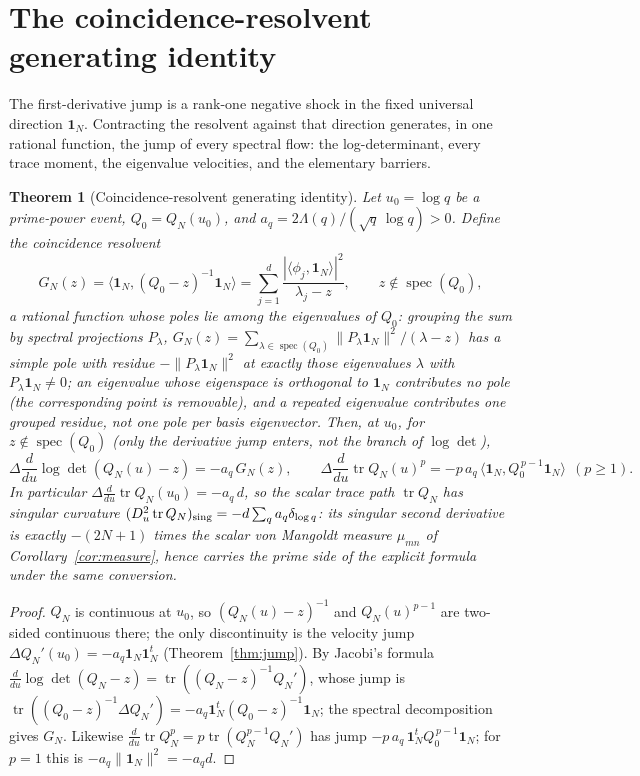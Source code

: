 \documentclass[11pt]{article}
\theoremstyle{plain}
\newtheorem{theorem}{Theorem}[section]
\theoremstyle{definition}
\theoremstyle{remark}
\newcommand{\one}{\mathbf 1}
\newcommand{\Lam}{\Lambda}
\begin{document}
\section{The coincidence-resolvent generating identity}\label{sec:deflation}

The first-derivative jump is a rank-one negative shock in the fixed universal
direction $\one_N$. Contracting the resolvent against that direction generates,
in one rational function, the jump of every spectral flow: the log-determinant,
every trace moment, the eigenvalue velocities, and the elementary barriers.

\begin{theorem}[Coincidence-resolvent generating identity]\label{thm:generating}
Let $u_0=\log q$ be a prime-power event, $Q_0=Q_N(u_0)$, and
$a_q=2\Lam(q)/(\sqrt q\,\log q)>0$. Define the \emph{coincidence resolvent}
\[
        G_N(z)=\bigl\langle\one_N,(Q_0-z)^{-1}\one_N\bigr\rangle
        =\sum_{j=1}^d\frac{|\langle\phi_j,\one_N\rangle|^2}{\lambda_j-z},
        \qquad z\notin\operatorname{spec}(Q_0),
\]
a rational function whose poles lie among the eigenvalues of $Q_0$: grouping the
sum by spectral projections $P_\lambda$,
$G_N(z)=\sum_{\lambda\in\operatorname{spec}(Q_0)}\|P_\lambda\one_N\|^2/(\lambda-z)$
has a simple pole with residue $-\|P_\lambda\one_N\|^2$ at exactly those
eigenvalues $\lambda$ with $P_\lambda\one_N\ne0$; an eigenvalue whose eigenspace
is orthogonal to $\one_N$ contributes no pole (the corresponding point is
removable), and a repeated eigenvalue contributes one grouped residue, not one
pole per basis eigenvector. Then, at $u_0$, for $z\notin
\operatorname{spec}(Q_0)$ (only the derivative jump enters, not the branch of
$\log\det$),
\[
 \Delta\frac{d}{du}\log\det(Q_N(u)-z)=-a_q\,G_N(z),
 \qquad
 \Delta\frac{d}{du}\operatorname{tr}Q_N(u)^p=-p\,a_q\,
 \bigl\langle\one_N,Q_0^{\,p-1}\one_N\bigr\rangle\ \ (p\ge1).
\]
In particular $\Delta\frac{d}{du}\operatorname{tr}Q_N(u_0)=-a_q\,d$, so the scalar
trace path $\operatorname{tr}Q_N$ has singular curvature
$(D_u^2\operatorname{tr}Q_N)_{\rm sing}=-d\sum_q a_q\delta_{\log q}$: its
singular second
derivative is exactly $-(2N+1)$ times the scalar von Mangoldt measure
$\mu_{mn}$ of Corollary~\ref{cor:measure}, hence carries the prime side of the
explicit formula under the same conversion.
\end{theorem}

\begin{proof}
$Q_N$ is continuous at $u_0$, so $(Q_N(u)-z)^{-1}$ and $Q_N(u)^{p-1}$ are
two-sided continuous there; the only discontinuity is the velocity jump
$\Delta Q_N'(u_0)=-a_q\one_N\one_N^t$ (Theorem~\ref{thm:jump}). By Jacobi's
formula $\frac{d}{du}\log\det(Q_N-z)=\operatorname{tr}((Q_N-z)^{-1}Q_N')$, whose
jump is $\operatorname{tr}((Q_0-z)^{-1}\Delta Q_N')=-a_q\one_N^t(Q_0-z)^{-1}\one_N$;
the spectral decomposition gives $G_N$. Likewise
$\frac{d}{du}\operatorname{tr}Q_N^p=p\operatorname{tr}(Q_N^{p-1}Q_N')$ has jump
$-p\,a_q\,\one_N^tQ_0^{\,p-1}\one_N$; for $p=1$ this is $-a_q\|\one_N\|^2=-a_qd$.
\end{proof}
\end{document}
